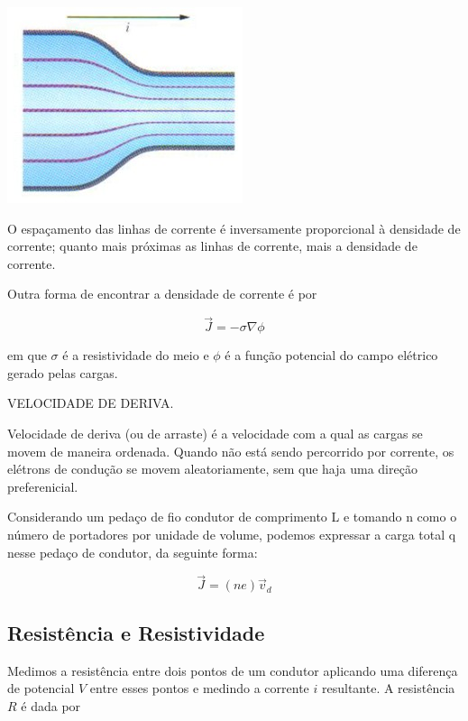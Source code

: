 \begin{center}
\includegraphics[scale=.7]{./imagens/28.jpg}
\end{center}

O espaçamento das linhas de corrente é inversamente proporcional à densidade de corrente; quanto mais próximas as linhas de corrente, mais a densidade de corrente.

Outra forma de encontrar a densidade de corrente é por

\begin{equation}
    \vec{J}=-\sigma \nabla\phi
\end{equation}

em que $\sigma$ é a resistividade do meio e $\phi$ é a função potencial do campo elétrico gerado pelas cargas.

VELOCIDADE DE DERIVA.

Velocidade de deriva (ou de arraste) é a velocidade com a qual as cargas se movem de maneira ordenada. Quando não está sendo percorrido por corrente, os elétrons de condução se movem aleatoriamente, sem que haja uma direção preferenicial. 

Considerando um pedaço de fio condutor de comprimento L e tomando n como o número de portadores por unidade de volume, podemos expressar a carga total q nesse pedaço de condutor, da seguinte forma:


\begin{equation}
    \vec{J}=(ne)\vec{v}_d
\end{equation}


\subsection{Resistência e Resistividade}

Medimos a resistência entre dois pontos de um condutor aplicando uma diferença de potencial $V$ entre esses pontos e medindo a corrente $i$ resultante. A resistência $R$ é dada por

